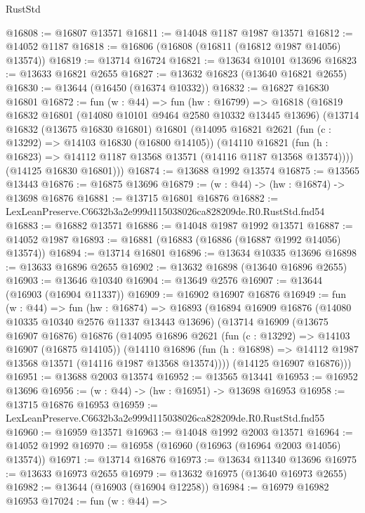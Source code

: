 \begin{lexlean}{RustStd}
\begin{coremodule}
@16808 := @16807 @13571
@16811 := @14048 @1187 @1987 @13571
@16812 := @14052 @1187
@16818 := @16806 (@16808 (@16811 (@16812 @1987 @14056) @13574))
@16819 := @13714 @16724
@16821 := @13634 @10101 @13696
@16823 := @13633 @16821 @2655
@16827 := @13632 @16823 (@13640 @16821 @2655)
@16830 := @13644 (@16450 (@16374 @10332))
@16832 := @16827 @16830 @16801
@16872 := fun (w : @44) =>
  fun (hw : @16799) =>
  @16818
    (@16819
      @16832
      @16801
      (@14080 @10101 @9464 @2580 @10332 @13445 @13696)
      (@13714
        @16832
        (@13675 @16830 @16801)
        @16801
        (@14095
          @16821
          @2621
          (fun (c : @13292) => @14103 @16830 (@16800 @14105))
          (@14110
            @16821
            (fun (h : @16823) => @14112 @1187 @13568 @13571 (@14116 @1187 @13568 @13574))))
        (@14125 @16830 @16801)))
@16874 := @13688 @1992 @13574
@16875 := @13565 @13443
@16876 := @16875 @13696
@16879 := (w : @44) -> (hw : @16874) -> @13698 @16876
@16881 := @13715 @16801 @16876
@16882 := LexLeanPreserve.C6632b3a2e999d115038026ca828209de.R0.RustStd.fnd54
@16883 := @16882 @13571
@16886 := @14048 @1987 @1992 @13571
@16887 := @14052 @1987
@16893 := @16881 (@16883 (@16886 (@16887 @1992 @14056) @13574))
@16894 := @13714 @16801
@16896 := @13634 @10335 @13696
@16898 := @13633 @16896 @2655
@16902 := @13632 @16898 (@13640 @16896 @2655)
@16903 := @13646 @10340
@16904 := @13649 @2576
@16907 := @13644 (@16903 (@16904 @11337))
@16909 := @16902 @16907 @16876
@16949 := fun (w : @44) =>
  fun (hw : @16874) =>
  @16893
    (@16894
      @16909
      @16876
      (@14080 @10335 @10340 @2576 @11337 @13443 @13696)
      (@13714
        @16909
        (@13675 @16907 @16876)
        @16876
        (@14095
          @16896
          @2621
          (fun (c : @13292) => @14103 @16907 (@16875 @14105))
          (@14110
            @16896
            (fun (h : @16898) => @14112 @1987 @13568 @13571 (@14116 @1987 @13568 @13574))))
        (@14125 @16907 @16876)))
@16951 := @13688 @2003 @13574
@16952 := @13565 @13441
@16953 := @16952 @13696
@16956 := (w : @44) -> (hw : @16951) -> @13698 @16953
@16958 := @13715 @16876 @16953
@16959 := LexLeanPreserve.C6632b3a2e999d115038026ca828209de.R0.RustStd.fnd55
@16960 := @16959 @13571
@16963 := @14048 @1992 @2003 @13571
@16964 := @14052 @1992
@16970 := @16958 (@16960 (@16963 (@16964 @2003 @14056) @13574))
@16971 := @13714 @16876
@16973 := @13634 @11340 @13696
@16975 := @13633 @16973 @2655
@16979 := @13632 @16975 (@13640 @16973 @2655)
@16982 := @13644 (@16903 (@16904 @12258))
@16984 := @16979 @16982 @16953
@17024 := fun (w : @44) =>

\end{coremodule}
\end{lexlean}
